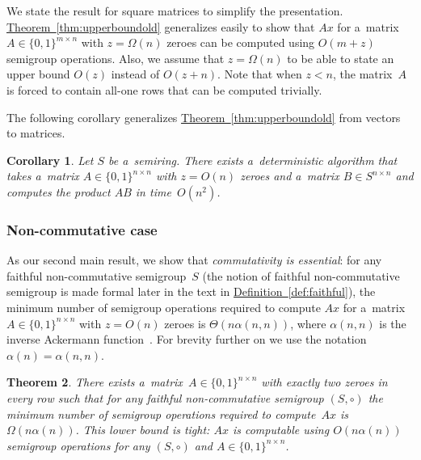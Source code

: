 \documentclass[11pt]{article}
\numberwithin{equation}{section}
\newtheorem{theorem}{Theorem}[section]
\newtheorem{corollary}[theorem]{Corollary}
\theoremstyle{definition}
\theoremstyle{plain}
\newcommand{\expref}[2]{\hyperref[#2]{#1~\ref{#2}}}
\theoremstyle{plain}\newtheorem{observation}[theorem]{Observation}
\begin{document}
%
We state the result for square matrices to simplify the presentation.
\expref{Theorem}{thm:upperboundold} generalizes easily to show that $Ax$ for a~matrix
$A \in \{0,1\}^{m \times n}$ with $z=\Omega(n)$ zeroes can be computed using
$O(m+z)$ semigroup operations. Also, we assume that $z=\Omega(n)$ to be able to
state an upper bound $O(z)$ instead of $O(z+n)$. Note that when $z<n$, the
matrix~$A$ is forced to contain all-one rows that can be computed trivially.

The following corollary generalizes \expref{Theorem}{thm:upperboundold}
from vectors to matrices.

\begin{corollary}
\label{cor:matrixmultiplicationold}
Let $S$ be a~semiring. There exists a~deterministic algorithm that takes a~matrix
\linebreak${A \in \{0,1\}^{n \times n}}$ with $z=O(n)$ zeroes and a~matrix
$B \in S^{n \times n}$ and computes the product $AB$ in time~$O(n^2)$.
\end{corollary}

\subsubsection{Non-commutative case}


As our second main result, we show that \emph{commutativity is essential}: for
any faithful non-commutative semigroup~$S$
%
%
(the notion of faithful non-commutative semigroup  is made formal
later in the text in %
\expref{Definition}{def:faithful}), %
the minimum number of semigroup operations
required to compute $Ax$ for a~matrix
$A \in \{0,1\}^{n \times n}$ with $z=O(n)$ zeroes is
%
$\Theta(n\alpha(n,n))$, where $\alpha(n,n)$ is the inverse Ackermann function~\cite{Tarjan75}.
For brevity further on we use the notation $\alpha(n) = \alpha(n,n)$. %
%
%
%

%
%
%
%

\begin{theorem}
\label{thm:lowerboundold}
There exists
a~matrix~$A \in \{0,1\}^{n \times n}$ with exactly two zeroes
in every row such that for any faithful non-commutative semigroup $(S, \circ)$
the minimum number of semigroup operations required to compute~$Ax$ is
$\Omega(n\alpha(n))$.
This lower bound is tight: $Ax$ is	computable using $O(n\alpha(n))$ semigroup
operations for any $(S, \circ)$ and $A\in \{0,1\}^{n \times n}$.
\end{theorem}

%
%
%
%
%
%
%
%
%
%
\end{document}
